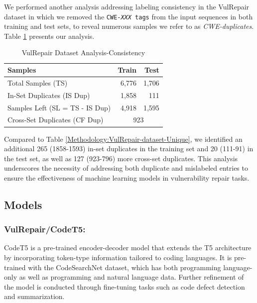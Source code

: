 We performed another analysis addressing labeling consistency in the VulRepair dataset in which we removed the \texttt{CWE-\emph{XXX} tags} from the input sequences in both training and test sets, to reveal numerous samples we refer to as \emph{CWE-duplicates}.
Table \ref{Methodology:VulRepair-dataset-Consistency} presents our analysis. 
%
\begin{table}
\centering
  \caption{VulRepair Dataset Analysis-Consistency}
  \label{Methodology:VulRepair-dataset-Consistency}
  \begin{tabular}{|l|r|r|}
    \hline
    Samples &Train &Test\\
    \hline
    Total Samples (TS)                                  &6,776  &1,706\\
    \hline
    In-Set Duplicates (IS Dup)                          &1,858  &111\\
    \hline
    Samples Left (SL = TS - IS Dup)                     &4,918  &1,595\\ 
    \hline
    {Cross-Set Duplicates (CF Dup)}  &\multicolumn{2}{c|}{923}\\
  \hline
\end{tabular}
\end{table}

Compared to Table \ref{Methodology:VulRepair-dataset-Unique}, we identified an additional 265 (1858-1593) in-set duplicates in the training set and  20 (111-91) in the test set, as well as  127 (923-796) more cross-set duplicates.
This analysis underscores the necessity of addressing both duplicate and mislabeled entries to ensure the effectiveness of machine learning models in vulnerability repair tasks.


\subsection{Models}
\subsubsection{VulRepair/CodeT5:} CodeT5\cite{wang2021codet5} is a pre-trained encoder-decoder model that extends the T5 architecture by incorporating token-type information tailored to coding languages.
It is pre-trained with the CodeSearchNet dataset, which has both programming language-only as well as programming and natural language data. Further refinement of the model is conducted through fine-tuning tasks such as code defect detection and summarization.

